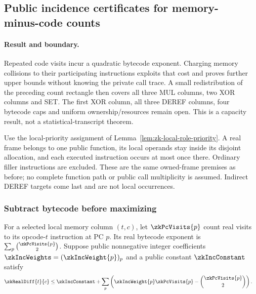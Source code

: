 \subsection{Public incidence certificates for memory-minus-code counts}\label{note:zk-count-incidence}

\paragraph{Result and boundary.} Repeated code visits incur a quadratic bytecode exponent. Charging memory collisions to their participating instructions exploits that cost and proves further upper bounds without knowing the private call trace. A small redistribution of the preceding count rectangle then covers all three MUL columns, two XOR columns and SET. The first XOR column, all three DEREF columns, four bytecode caps and uniform ownership/resources remain open. This is a capacity result, not a statistical-transcript theorem.

Use the local-priority assignment of Lemma~\ref{lem:zk-local-role-priority}. A real frame belongs to one public function, its local operands stay inside its disjoint allocation, and each executed instruction occurs at most once there. Ordinary filler instructions are excluded. These are the same owned-frame premises as before; no complete function path or public call multiplicity is assumed. Indirect DEREF targets come last and are not local occurrences.

\subsubsection{Subtract bytecode before maximizing}

For a selected local memory column $(t,c)$, let $\zkPcVisits{p}$ count real visits to its opcode-$t$ instruction at PC $p$. Its real bytecode exponent is $\sum_p\binom{\zkPcVisits{p}}2$. Suppose public nonnegative integer coefficients $\zkIncWeights=(\zkIncWeight{p})_p$ and a public constant $\zkIncConstant$ satisfy
\[
 \zkRealDiff{t}{c}
 \le\zkIncConstant+\sum_p\left(\zkIncWeight{p}\zkPcVisits{p}-\binom{\zkPcVisits{p}}2\right).
\]


